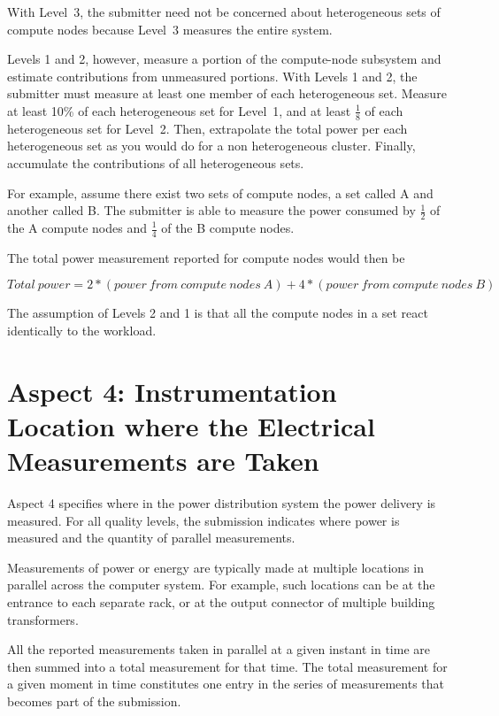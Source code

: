 \noindent
With Level~3, the submitter need not be concerned about heterogeneous sets of compute nodes because Level~3 measures the entire system.
\wl

\noindent
Levels 1 and 2, however, measure a portion of the compute-node subsystem and estimate contributions from unmeasured portions.
With Levels 1 and 2, the submitter must measure at least one member of each heterogeneous set.
Measure at least 10\% of each heterogeneous set for Level~1, and at least $\frac{1}{8}$ of each heterogeneous set for Level~2.
Then, extrapolate the total power per each heterogeneous set as you would do for a non heterogeneous cluster.
Finally, accumulate the contributions of all heterogeneous sets.
\wl

\noindent
For example, assume there exist two sets of compute nodes, a set called A and another called B.
The submitter is able to measure the power 
consumed by $ \frac{1}{2} $ of the A compute nodes and $\frac{1}{4}$ of the B compute nodes.
\wl

\noindent
The total power measurement reported for compute nodes would then be 

\noindent
\[ Total~power=2*(power~from~compute~nodes~A) + 4*(power~from~compute~nodes~B) \]

\noindent
The assumption of Levels 2 and 1 is that all the compute nodes in a set react identically to the workload.


\section{Aspect 4: Instrumentation Location where the Electrical Measurements are Taken}
\label{sec:A4wEMaT}
Aspect 4 specifies where in the power distribution system the power delivery is measured.
For all quality levels, the submission indicates where power is measured and the quantity of parallel measurements.
\wl

\noindent
Measurements of power or energy are typically made at multiple locations in parallel across the computer system.
For example, such locations can be at the entrance to each separate rack, or at the output connector of multiple building transformers.
\wl

\noindent
All the reported measurements taken in parallel at a given instant in time are then summed into a total measurement for that time.
The total measurement for a given moment in time constitutes one entry in the series of measurements that becomes part of the submission.
\wl

